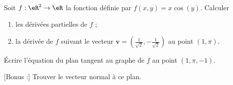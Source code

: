 \begin{exercice}\label{exodevoir2-0002}

Soit $f:\eR^2\to\eR$ la fonction définie par $f(x,y)=x\cos (y)$. Calculer
\begin{enumerate}
\item les dérivées partielles de $f$ ;
\item la dérivée de $f$ suivant le vecteur $\displaystyle \mathbf{v}= \left(\frac{1}{\sqrt{2}},-\frac{1}{\sqrt{2}}\right)$ au point $(1,\pi)$.
\end{enumerate}
Écrire l'équation du plan tangent au graphe de $f$ au point $(1,\pi,-1)$. 

[Bonus :] Trouver le vecteur normal à ce plan.  
\end{exercice}
